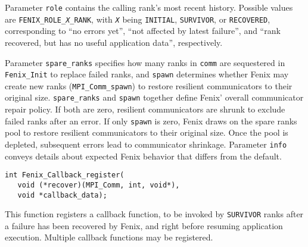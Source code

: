 Parameter \texttt{role} contains the calling rank's most recent history.
Possible values are \texttt{FENIX\_ROLE\_\textit{X}\_RANK},
with \texttt{\textit{X}} being \texttt{INITIAL}, \texttt{SURVIVOR}, or \texttt{RECOVERED},
corresponding to ``no errors yet'', ``not affected by latest failure'', 
and ``rank recovered, but has no useful application data'', respectively.

Parameter \texttt{spare\_ranks} specifies how many ranks in \texttt{comm} are 
sequestered in \texttt{Fenix\_Init}  to replace failed ranks, and
\texttt{spawn} determines whether Fenix  may create new ranks (\texttt{MPI\_Comm\_spawn}) 
to restore resilient communicators to their original size. 
\texttt{spare\_ranks} and \texttt{spawn} together define Fenix' overall communicator
repair policy. 
If both are zero, resilient communicators are shrunk to exclude failed ranks after 
an error.
If only \texttt{spawn} is zero, Fenix draws on the spare 
ranks pool to restore resilient communicators to their original size. 
Once the pool is depleted, subsequent errors lead to communicator shrinkage.
Parameter \texttt{info} conveys details about expected Fenix behavior
that differs from the default.

\begin{verbatim}
int Fenix_Callback_register(
   void (*recover)(MPI_Comm, int, void*),
   void *callback_data);
\end{verbatim}
This function registers a callback function, to be invoked by \texttt{SURVIVOR}
ranks after a failure has been recovered by Fenix, and right before resuming application
execution.
Multiple callback functions may be registered.

